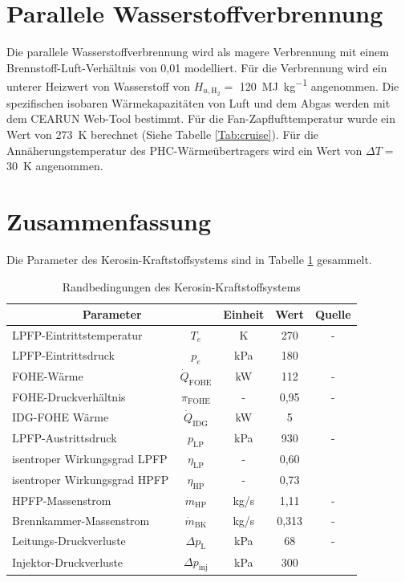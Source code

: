 \section{Parallele Wasserstoffverbrennung}

Die parallele Wasserstoffverbrennung wird als magere Verbrennung mit einem Brennstoff-Luft-Verhältnis von 0,01 modelliert. Für die Verbrennung wird ein unterer Heizwert von Wasserstoff von $H_{u, \mathrm{H}_2}= $ \SI{120}{\mega\J\per\kg} angenommen. Die spezifischen isobaren Wärmekapazitäten von Luft und dem Abgas werden mit dem CEARUN Web-Tool \cite{Leader.} bestimmt. Für die Fan-Zapflufttemperatur wurde ein Wert von \SI{273}{\K} berechnet (Siehe Tabelle \ref{Tab:cruise}). Für die Annäherungstemperatur des PHC-Wärmeübertragers wird ein Wert von $\Delta T= $ \SI{30}{\K} angenommen. %

\section{Zusammenfassung}

Die Parameter des Kerosin-Kraftstoffsystems sind in Tabelle \ref{Tab:referenz_parametrisiert} gesammelt.

\begin{table}[ht]
    \centering
	\caption{Randbedingungen des Kerosin-Kraftstoffsystems}
	\begin{tabular} {|l|c|c|c|c|} \hline%
		\multicolumn{2}{|c|}{Parameter} & Einheit & Wert & Quelle\\ \hline\hline%
        LPFP-Eintrittstemperatur & $T_e$ & K & 270 & - \\ \hline
        LPFP-Eintrittsdruck & $p_e$ & kPa & 180 & \cite{EatonFuelSystemsDivision.2013} \\ \hline
        FOHE-Wärme & $\dot{Q}_{\mathrm{FOHE}}$ & kW & 112 & - \\ \hline
        FOHE-Druckverhältnis & $\pi_{\mathrm{FOHE}}$ & - & 0,95 & - \\ \hline
        IDG-FOHE Wärme  & $\dot{Q}_\mathrm{IDG}$ & kW & 5 & \cite{Sciatti.2024} \\ \hline
        LPFP-Austrittsdruck & $p_\mathrm{LP}$ & kPa & 930 & - \\ \hline
        isentroper Wirkungsgrad LPFP & $\eta_\mathrm{LP}$ & - & 0,60 & \cite{Zhou.2023} \\ \hline
        isentroper Wirkungsgrad HPFP & $\eta_\mathrm{HP}$ & - & 0,73 & \cite{Xu.2024} \\ \hline
        HPFP-Massenstrom & $\dot{m}_\mathrm{HP}$ & kg/s & 1,11 & - \\ \hline
        Brennkammer-Massenstrom & $\dot{m}_\mathrm{BK}$ & kg/s & 0,313 & - \\ \hline
        Leitungs-Druckverluste & $\Delta p_\mathrm{L}$ & kPa & 68 & - \\ \hline
        Injektor-Druckverluste & $\Delta p_\mathrm{inj}$ & kPa & 300 & \cite{Mazaheri.2012} \\ \hline
	\end{tabular}	
    \label{Tab:referenz_parametrisiert}%
\end{table}
\FloatBarrier 

